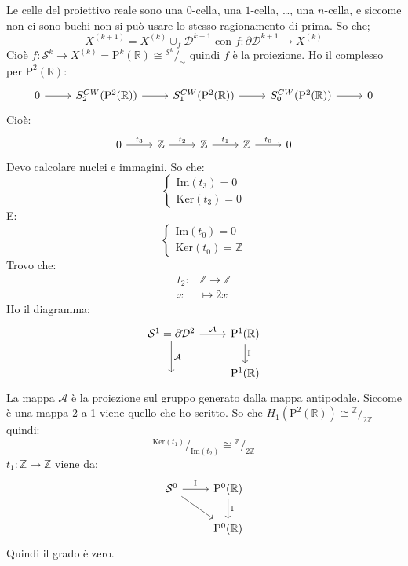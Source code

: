 \documentclass[10pt, twoside=false, x11names]{scrbook}
\newcommand{\Z}{\mathbb{Z}}
\newcommand{\im}[1]{\mathrm{Im}( #1 )}
\renewcommand{\ker}[1]{\mathrm{Ker}( #1)}
\newcommand{\Pjr}[1]{\mathrm{P}^#1 (\mathbb{R})}
\newcommand{\Id}[1][]{\mathbb{I}_#1}
\newcommand{\Sph}[1][]{\mathcal{S}^#1}
\newcommand{\Disk}[1][]{\mathcal{D}^#1}
\newcommand*\quot[2]{{^{\textstyle #1}\big/_{\textstyle #2}}}
\begin{document}
Le celle del proiettivo reale sono una $ 0 $-cella, una $ 1 $-cella, \dots, una
$ n $-cella, e siccome non ci sono buchi non si può usare lo stesso ragionamento
di prima. So che;
\[
  X^{(k+1)} = X^{(k)} \cup_f \Disk{k+1} \text{ con } f \colon \partial \Disk{k+1} \to X^{(k)}
\]
Cioè $ f \colon \Sph{k} \to X^{(k)} = \Pjr{k} \cong \quot{\Sph{k}}{\sim} $ quindi
$ f $ è la proiezione. Ho il complesso per $ \Pjr{2} $:
\[
  \begin{tikzcd}
    0 \rar & S^{CW}_{2}(\Pjr{2}) \rar & S_1^{CW}(\Pjr{2}) \rar & S_{0}^{CW}(\Pjr{2}) \rar & 0
  \end{tikzcd}
\]
Cioè:
\[
  \begin{tikzcd}
    0 \rar{t_3} & \Z \rar{t_2} & \Z \rar{t_1} & \Z \rar{t_0} & 0
  \end{tikzcd}
\]
Devo calcolare nuclei e immagini. So che:
\[
  \begin{cases}
    \im{t_3} = 0 \\
    \ker{t_3} = 0
  \end{cases}
\]
E:
\[
  \begin{cases}
    \im{t_0} = 0\\
    \ker{t_0} = \Z
  \end{cases}
\]
Trovo che:
\begin{align*}
  t_2 \colon & \Z \to \Z \\
  x & \mapsto 2 x
\end{align*}
Ho il diagramma:
\[
  \begin{tikzcd}
    \Sph{1} = \partial \Disk{2} \rar{\mathcal{A}} \dar{\mathcal{A}} & \Pjr{1} \dar{\Id{}} \\
    {} & \Pjr{1}
  \end{tikzcd}
\]
La mappa $ \mathcal{A} $ è la proiezione sul gruppo generato dalla mappa antipodale.
Siccome è una mappa 2 a 1 viene quello che ho scritto.
So che $ H_1(\Pjr{2}) \cong \quot{\Z}{2 \Z} $ quindi:
\[
  \quot{\ker{t_1}}{\im{t_2}} \cong \quot{\Z}{2 \Z}
\]
$ t_1 \colon \Z \to \Z $ viene da:
\[
  \begin{tikzcd}
    \Sph{0} \rar{\Id{}} \arrow{rd}{} & \Pjr{0} \dar{\Id{}} \\
    {} & \Pjr{0}
  \end{tikzcd}
\]
Quindi il grado è zero.
\end{document}
